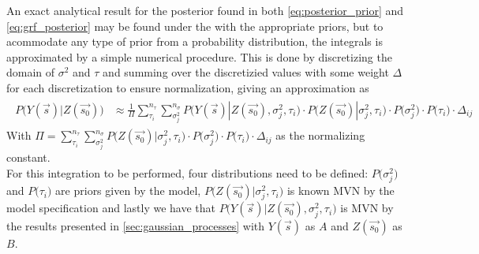 \documentclass{article}
\begin{document}
An exact analytical result for the posterior found in both \ref{eq:posterior_prior} and \ref{eq:grf_posterior} may be found under the with the appropriate priors, but to acommodate any type of prior from a probability distribution, the integrals is approximated by a simple numerical procedure. This is done by discretizing the domain of $\sigma^2$ and $\tau$ and summing over the discretizied values with some weight $\Delta$ for each discretization to ensure normalization, giving an approximation as
\begin{align*}
\begin{split}
P \big( Y(\vec{s}) | Z(\vec{s_0}) \big) &\approx \frac{1}{\Pi}\sum_{\tau_i}^{n_{\tau}} \sum_{\sigma^2_j}^{n_{\sigma}} P \big( Y(\vec{s}) | Z(\vec{s_0}), \sigma^2_j, \tau_i \big) \cdot P\big( Z(\vec{s_0}) | \sigma^2_j, \tau_i \big) \cdot P\big( \sigma^2_j \big) \cdot P\big( \tau_i \big) \cdot \Delta_{ij}
\end{split}
\end{align*}
With $\Pi = \sum_{\tau_i}^{n_{\tau}} \sum_{\sigma^2_j}^{n_{\sigma}} P\big( Z(\vec{s_0}) | \sigma^2_j, \tau_i \big) \cdot P\big( \sigma^2_j \big) \cdot P\big( \tau_i \big) \cdot \Delta_{ij}$ as the normalizing constant. \\

For this integration to be performed, four distributions need to be defined: $P\big( \sigma^2_j \big)$ and $P\big( \tau_i \big)$ are priors given by the model, $P\big( Z(\vec{s_0}) | \sigma^2_j, \tau_i \big)$ is known MVN by the model specification and lastly we have that $P \big( Y(\vec{s}) | Z(\vec{s_0}), \sigma^2_j, \tau_i \big)$ is MVN by the results presented in \ref{sec:gaussian_processes} with $Y(\vec{s})$ as $A$ and $Z(\vec{s_0})$ as $B$. \\
\end{document}
